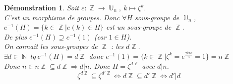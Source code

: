 \documentclass[a4paper, oneside]{report}
\theoremstyle{break}
\newtheorem*{demo}{Démonstration}
\DeclareMathOperator{\N}{\mathbb{N}}
\DeclareMathOperator{\Z}{\mathbb{Z}}
\DeclareMathOperator{\U}{\mathbb{U}}
\begin{document}
\begin{demo}
	Soit $\displaystyle e : \Z \rightarrow \U_n,~	k \mapsto \zeta^k$.\\
	C'est un morphisme de groupes. Donc $\forall H$ sous-groupe de $\U_n$, $e^{-1}(H)=\{k\in \Z |e(k)\in H \}$ est un sous-groupe de $\Z$.\\
	De plus $e^{-1}(H)\supseteq e^{-1}(1)$ (car $1\in H$).\\
	On connaît les sous-groupes de $\Z$ : les $d\Z$.\\
	$\exists d\in \N~tq~ e^{-1}(H)=d\Z$ donc $e^{-1}(1)=\{k\in \Z | \zeta^k= e^{\frac{2i\pi k}{n}} =1 \}=n\Z$\\
	Donc $n\in n\Z \subseteq d\Z \Rightarrow d|n$. Donc $H=\zeta^{d\Z}$ avec $d|n$.
	$$\zeta^{d\Z}\subseteq \zeta^{d'\Z}\Leftrightarrow d\Z \subseteq d'\Z \Leftrightarrow d'|d$$
~
\end{demo}
\end{document}
